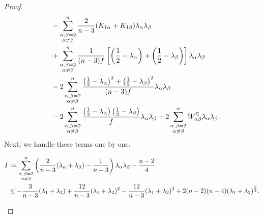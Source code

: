 \documentclass[10pt,a4paper]{amsart}
\begin{document}
\begin{proof}
\begin{equation*}
\begin{aligned}
		&\quad - \sum_{\substack{\alpha,\beta=2 \\ \alpha\neq\beta}}^n \frac{2}{n-3}(K_{1\alpha} + K_{1\beta})\lambda_\alpha\lambda_\beta \notag \\
		&\quad + \sum_{\substack{\alpha,\beta=2 \\ \alpha\neq\beta}}^n \frac{1}{(n-3)f}\left[\left(\frac{1}{2} - \lambda_{\alpha}\right) + \left(\frac{1}{2} - \lambda_{\beta}\right)\right]\lambda_\alpha\lambda_\beta \notag \\
		&\quad - 2\sum_{\substack{\alpha,\beta=2 \\ \alpha\neq\beta}}^n \frac{\left(\frac{1}{2} - \lambda_{\alpha}\right)^2 + \left(\frac{1}{2} - \lambda_{\beta}\right)^2}{(n-3)f}\lambda_\alpha\lambda_\beta \notag \\
		&\quad - 2\sum_{\substack{\alpha,\beta=2 \\ \alpha\neq\beta}}^n \frac{\left(\frac{1}{2} - \lambda_{\alpha}\right)\left(\frac{1}{2} - \lambda_{\beta}\right)}{f}\lambda_\alpha\lambda_\beta + 2\sum_{\substack{\alpha,\beta=2 \\ \alpha\neq\beta}}^n W^{\Sigma}_{\alpha\beta}\lambda_\alpha\lambda_\beta. \label{eq:gradient-decomposition}
	\end{aligned}
\end{equation*}
	Next, we handle these terms one by one.
	
	\begin{claim}\label{claim:I}
		\begin{equation*}
			\begin{aligned}
			I &:= \sum_{\substack{\alpha,\beta=2 \\ \alpha\neq\beta}}^n \left(\frac{2}{n-3}(\lambda_{\alpha} + \lambda_{\beta}) - \frac{1}{n-3}\right)\lambda_{\alpha}\lambda_{\beta} - \frac{n-2}{4} \notag \\
			&\leq -\frac{3}{n-3}(\lambda_{1}+\lambda_{2}) + \frac{12}{n-3}(\lambda_{1}+\lambda_{2})^2 - \frac{12}{n-3}(\lambda_{1}+\lambda_{2})^3 + 2(n-2)(n-4)(\lambda_{1}+\lambda_{2})^{\frac{3}{2}}. %
		\end{aligned}
		\end{equation*}
	\end{claim}
	

\end{proof}
\end{document}
